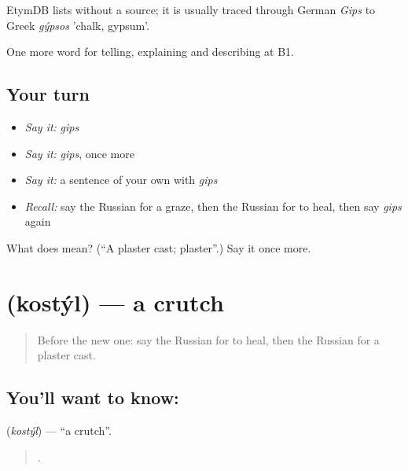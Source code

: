 \begin{cousinweb}
EtymDB lists \emph{} without a source; it is usually traced through German \emph{Gips} to Greek \emph{gýpsos} 'chalk, gypsum'.
\end{cousinweb}

\begin{grammarlens}[title={What you've built}]
One more word for telling, explaining and describing at B1.
\end{grammarlens}

\subsection*{Your turn}
\begin{itemize}
\raggedright
  \item \emph{Say it:} \emph{gips}
  \item \emph{Say it:} \emph{gips}, once more
  \item \emph{Say it:} a sentence of your own with \emph{gips}
  \item \emph{Recall:} say the Russian for a graze, then the Russian for to heal, then say \emph{gips} again
\end{itemize}

\begin{tcolorbox}[breakable,colback=teal!4,colframe=teal!35!black,title={Before you move on}]
What does  mean? (\textquotedblleft{}A plaster cast; plaster\textquotedblright{}.) Say it once more.
\end{tcolorbox}
\section[\texorpdfstring{\ru{костыль} (kostýl)}{костыль (kostýl)}]{ (kostýl) — a crutch}

\label{lesson:RU-C484-kostyl}



\begin{quote}
Before the new one: say the Russian for to heal, then the Russian for a plaster cast.
\end{quote}

\subsection*{You'll want to know: }
\textbf{} (\emph{kostýl}) — \textquotedblleft{}a crutch\textquotedblright{}.

\begin{quote}
     .
\end{quote}

